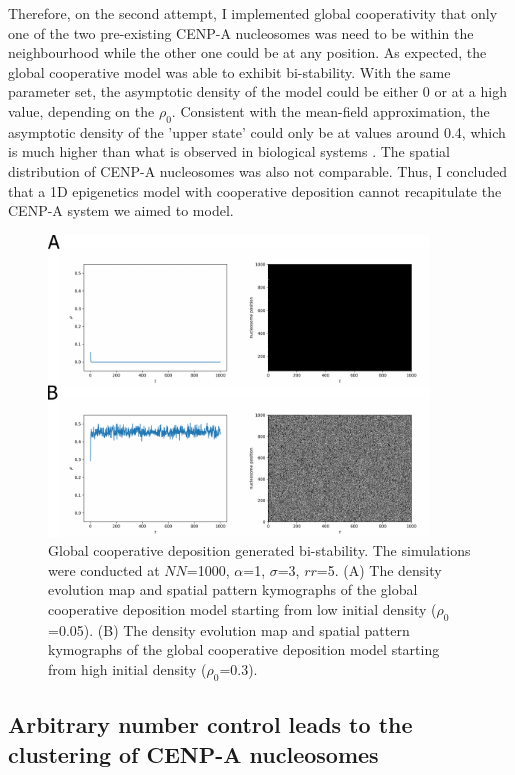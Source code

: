 Therefore, on the second attempt, I implemented global cooperativity that only one of the two pre-existing CENP-A nucleosomes was need to be within the neighbourhood while the other one could be at any position. As expected, the global cooperative model was able to exhibit bi-stability. With the same parameter set, the asymptotic density of the model could be either 0 or at a high value, depending on the $\rho_{0}$. Consistent with the mean-field approximation, the asymptotic density of the 'upper state' could only be at values around 0.4, which is much higher than what is observed in biological systems \citep{Bodor2014}. The spatial distribution of CENP-A nucleosomes was also not comparable. Thus, I concluded that a 1D epigenetics model with cooperative deposition cannot recapitulate the CENP-A system we aimed to model. 

\begin{figure}[htbp]
  \centering
  \includegraphics[width=0.9\textwidth]{chapter2/figures/global_coop.pdf}
  \caption[Global cooperative deposition generated bi-stability]{Global cooperative deposition generated bi-stability. The simulations were conducted at $NN$=1000, $\alpha$=1, $\sigma$=3, $rr$=5. (A) The density evolution map and spatial pattern kymographs of the global cooperative deposition model starting from low initial density ($\rho_{0}$=0.05). (B) The density evolution map and spatial pattern kymographs of the global cooperative deposition model starting from high initial density ($\rho_{0}$=0.3).}
  \label{fig:globalCoop}
\end{figure}

\subsection{Arbitrary number control leads to the clustering of CENP-A nucleosomes}

